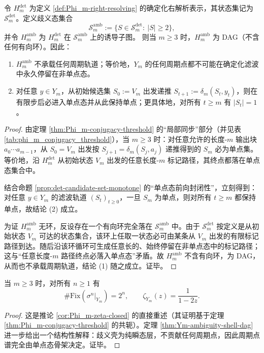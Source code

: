 \begin{theorem}\label{thm:Ym-ambiguity-shell-dag}
令 $H_m^{\mathrm{det}}$ 为定义 \ref{def:Phi_m-right-resolving} 的确定化右解析表示，其状态集记为 $\mathcal{S}_m^{\mathrm{det}}$。定义歧义态集合
\[
\mathcal{S}_m^{\mathrm{amb}}:=\{S\in\mathcal{S}_m^{\mathrm{det}}:\ |S|\ge 2\},
\]
并令 $H_m^{\mathrm{amb}}$ 为 $H_m^{\mathrm{det}}$ 在 $\mathcal{S}_m^{\mathrm{amb}}$ 上的诱导子图。
则当 $m\ge 3$ 时，$H_m^{\mathrm{amb}}$ 为 DAG（不含任何有向环）。因此：
\begin{enumerate}
  \item $H_m^{\mathrm{amb}}$ 不承载任何周期轨道；等价地，$Y_m$ 的任何周期点都不可能在确定化滤波中永久停留在非单点态。
  \item 对任意 $y\in Y_m$，从初始候选集 $S_0:=V_m$ 出发递推 $S_{t+1}:=\delta_m(S_t,y_t)$，则在有限步后必进入单点态并从此保持单点；更具体地，对所有 $t\ge m$ 有 $|S_t|=1$。
\end{enumerate}
\end{theorem}
\begin{proof}
由定理 \ref{thm:Phi_m-conjugacy-threshold} 的“局部同步”部分（并见表 \ref{tab:phi_m_conjugacy_threshold}），当 $m\ge 3$ 时：对任意允许的长度-$m$ 输出块 $a_0\cdots a_{m-1}$，从 $S_0=V_m$ 出发按 $S_{j+1}=\delta_m(S_j,a_j)$ 递推得到的 $S_m$ 必为单点集。等价地，沿 $H_m^{\mathrm{det}}$ 从初始状态 $V_m$ 出发的任意长度-$m$ 标记路径，其终点都落在单点态集合中。

结合命题 \ref{prop:det-candidate-set-monotone} 的“单点态前向封闭性”，立刻得到：对任意 $y\in Y_m$ 的滤波轨道 $(S_t)_{t\ge 0}$，一旦 $S_m$ 为单点，则对所有 $t\ge m$ 都保持单点，故结论 (2) 成立。

为证 $H_m^{\mathrm{amb}}$ 无环，反设存在一个有向环完全落在 $\mathcal{S}_m^{\mathrm{amb}}$ 中。由于 $\mathcal{S}_m^{\mathrm{det}}$ 按定义是从初始状态 $V_m$ 可达的状态集合，该环上任取一状态必可由某条从 $V_m$ 出发的有限标记路径到达。随后沿该环循环可生成任意长的、始终停留在非单点态中的标记路径；这与“任意长度-$m$ 路径终点必落入单点态”矛盾。故 $H_m^{\mathrm{amb}}$ 不含有向环，为 DAG，从而也不承载周期轨道，结论 (1) 随之成立。证毕。
\end{proof}

\begin{corollary}\label{cor:Ym-periodic-rigidity}
当 $m\ge 3$ 时，对所有 $n\ge 1$ 有
\[
\#\mathrm{Fix}(\sigma^n|_{Y_m})=2^n,
\qquad
\zeta_{Y_m}(z)=\frac{1}{1-2z}.
\]
\end{corollary}
\begin{proof}
这是推论 \ref{cor:Phi_m-zeta-closed} 的直接重述（其证明基于定理 \ref{thm:Phi_m-conjugacy-threshold} 的共轭）。定理 \ref{thm:Ym-ambiguity-shell-dag} 进一步给出一个结构性解释：歧义壳为纯瞬态层，不贡献任何周期点，因此周期点谱完全由单点态骨架决定。证毕。
\end{proof}

